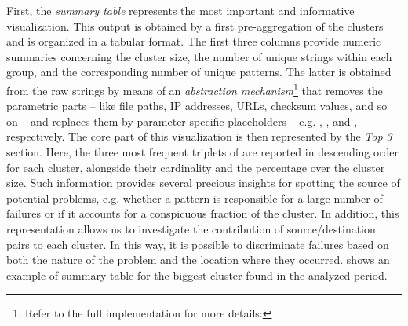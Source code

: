 First, the \textit{summary table} represents the most important and informative visualization.
This output is obtained by a first pre-aggregation of the clusters and is organized in a tabular format.
The first three columns provide numeric summaries concerning the  cluster size, the number of unique strings within each group, and the corresponding number of unique patterns.
The latter is obtained from the raw strings by means of an \textit{abstraction mechanism}\footnote{Refer to the full implementation for more details: \githubabstractions} that removes the parametric parts -- like file paths, IP addresses, URLs, checksum values, and so on -- and replaces them by parameter-specific placeholders -- e.g. , ,  and  , respectively.
The core part of this visualization is then represented by the \textit{Top 3} section. Here, the three most frequent triplets of  are reported in descending order for each cluster, alongside their cardinality and the percentage over the cluster size.
Such information provides several precious insights for spotting the source of potential problems, e.g. whether a pattern is responsible for a large number of failures or if it accounts for a conspicuous fraction of the cluster. 
In addition, this representation allows us to investigate the contribution of source/destination pairs to each cluster.
In this way, it is possible to discriminate failures based on both the nature of the problem and the location where they occurred.
 shows an example of summary table for the biggest cluster found in the analyzed period.


